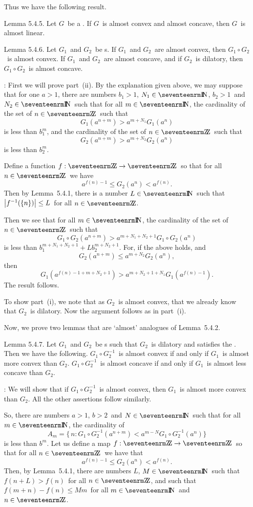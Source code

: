 Thus we have the following result.

\proclaim Lemma 5.4.5. Let $G$\ be a \phifunction. If $G$\ is almost convex and
almost concave, then $G$\ is almost linear.

\proclaim Lemma 5.4.6. Let $G_1$\ and $G_2$\ be \phifunction s.
\itemi If $G_1$\ and $G_2$\ are almost convex, then $G_1\circ G_2$\ is almost
convex.
\itemii If $G_1$\ and $G_2$\ are almost concave, and if $G_2$\ is dilatory,
then $G_1\circ G_2$\ is almost concave.

\Proof: First we will prove part~(ii). By the explanation given above, we
may suppose that for one $a>1$, there are numbers $b_1>1$, $N_1\in\N$,
$b_2>1$\ and $N_2\in\N$\ such that for all $m\in\N$,
the cardinality of the set of $n\in\Z$\ such that
$$ G_1(a^{n+m}) > a^{m+N_1} G_1(a^n) $$
is less than $b_1^m$, and the cardinality of the set of $n\in\Z$\ such that
$$ G_2(a^{n+m}) > a^{m+N_2} G_2(a^n) $$
is less than $b_2^m$.

Define a function $f:\Z\to\Z$\ so that for all $n\in\Z$\ we have
$$ a^{f(n)-1} \le G_2(a^n) < a^{f(n)} .$$
Then by Lemma~5.4.1, there is a number $L\in\N$\ such that $\left| f^{-1}(\{n\}) \right|
\le L$\ for all $n\in\Z$. 

Then we see that for all
$m\in\N$, the cardinality of the set of $n\in\Z$\ such that
$$ G_1\circ G_2(a^{n+m}) > a^{m+N_1+N_2+1} G_1\circ G_2(a^n) $$
is less than $b_1^{m+N_1+N_2+1} + L b_2^{m+N_2+1}$.
For, if the above holds, and
$$ G_2(a^{n+m}) \le a^{m+N_2} G_2(a^n) ,$$
then
$$ G_1(a^{f(n)-1+m+N_2+1}) > a^{m+N_2+1+N_1} G_1(a^{f(n)-1}) .$$
The result follows.

To show part~(i), we note that as $G_2$\ is almost convex, that we already know
that $G_2$\ is dilatory. Now the argument follows as in part~(i).
\endproof

Now, we prove two lemmas that are `almost' analogues of Lemma~5.4.2.

\proclaim Lemma 5.4.7. Let $G_1$\ and $G_2$\ be \phifunction s such that $G_2$\
is dilatory and satisfies the \Deltacond. Then we have the following.
\itemi $G_1\circ G_2^{-1}$\ is almost convex if and only if $G_1$\ is almost
more convex than $G_2$.
\itemii $G_1\circ G_2^{-1}$\ is almost concave if and only if $G_1$\ is almost
less concave than $G_2$.

\Proof: We will show that if $G_1\circ G_2^{-1}$\ is almost convex, then $G_1$\
is almost more convex than $G_2$. All the other assertions follow similarly.

So, there are numbers $a>1$, $b>2$\ and $N\in\N$\ such that for
all $m\in\N$, the cardinality of
$$ A_m = \{\, n :
   G_1\circ G_2^{-1}(a^{n+m}) < a^{m-N} G_1\circ G_2^{-1}(a^n) \} $$
is less than $b^m$. Let us define a map $f:\Z\to\Z$\ so that for all $n\in\Z$\
we have that
$$ a^{f(n)-1} \le G_2(a^n) < a^{f(n)} .$$
Then, by Lemma~5.4.1, there are numbers $L$, $M\in\N$\ such that
$f(n+L) > f(n)$\ for all $n\in\Z$, and such that $f(m+n) - f(n) \le
Mm$\ for all $m\in\N$\ and $n\in\Z$.

